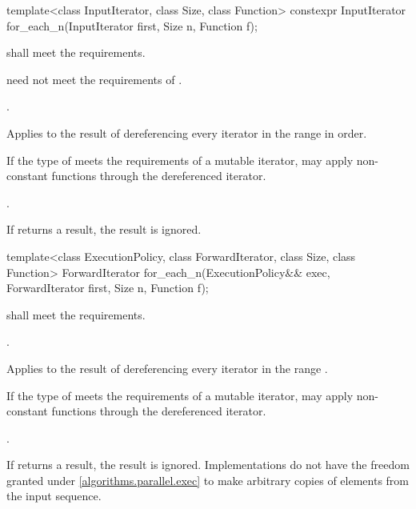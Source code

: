 %
\begin{itemdecl}
template<class InputIterator, class Size, class Function>
  constexpr InputIterator for_each_n(InputIterator first, Size n, Function f);
\end{itemdecl}

\begin{itemdescr}
\pnum
\requires
{} shall meet the  requirements.
\begin{note}
 need not meet
the requirements of .
\end{note}

\pnum
\requires
{}.

\pnum
\effects
Applies  to the result of dereferencing
every iterator in the range  in order.
\begin{note}
If the type of  meets the requirements of a mutable iterator,
 may apply non-constant functions through the dereferenced iterator.
\end{note}

\pnum
\returns
{}.

\pnum
\remarks
If  returns a result, the result is ignored.
\end{itemdescr}

%
\begin{itemdecl}
template<class ExecutionPolicy, class ForwardIterator, class Size, class Function>
  ForwardIterator for_each_n(ExecutionPolicy&& exec, ForwardIterator first, Size n,
                             Function f);
\end{itemdecl}

\begin{itemdescr}
\pnum
\requires
{} shall meet the  requirements.

\pnum
\requires
{}.

\pnum
\effects
Applies  to the result of dereferencing
every iterator in the range .
\begin{note}
If the type of  meets the requirements of a mutable iterator,
 may apply non-constant functions through the dereferenced iterator.
\end{note}

\pnum
\returns
{}.

\pnum
\remarks
If  returns a result, the result is ignored.
Implementations do not have
the freedom granted under \ref{algorithms.parallel.exec}
to make arbitrary copies of elements from the input sequence.
\end{itemdescr}


